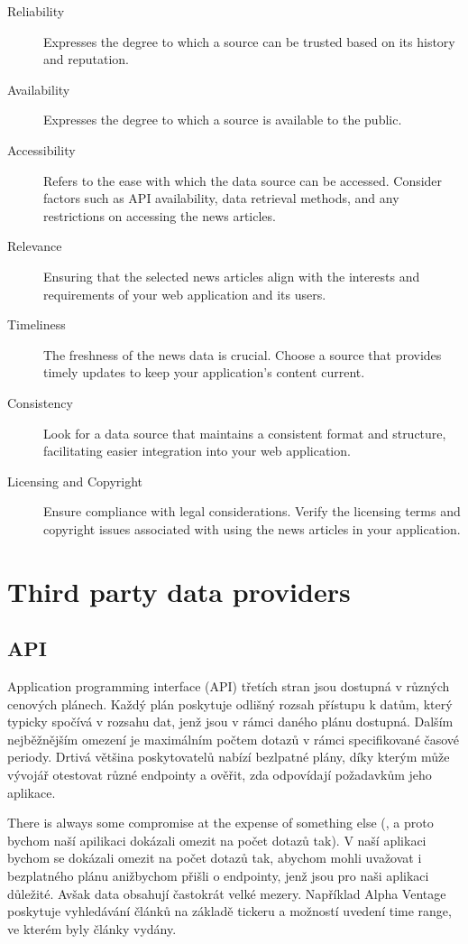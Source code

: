 \begin{description}
    \item[Reliability] Expresses the degree to which a source can be trusted based on its history and reputation.
    \item[Availability] Expresses the degree to which a source is available to the public.
    \item[Accessibility] Refers to the ease with which the data source can be accessed. Consider factors such as API availability, data retrieval methods, and any restrictions on accessing the news articles.
    \item[Relevance] Ensuring that the selected news articles align with the interests and requirements of your web application and its users.
    \item[Timeliness] The freshness of the news data is crucial. Choose a source that provides timely updates to keep your application's content current.
    \item[Consistency] Look for a data source that maintains a consistent format and structure, facilitating easier integration into your web application.
    \item[Licensing and Copyright] Ensure compliance with legal considerations. Verify the licensing terms and copyright issues associated with using the news articles in your application.
\end{description}

\section{Third party data providers}
\subsection*{API}
Application programming interface (API) třetích stran jsou dostupná v různých cenových plánech. Každý plán poskytuje odlišný rozsah přístupu k datům, který typicky spočívá v rozsahu dat, jenž jsou v rámci daného plánu dostupná. Dalším nejběžnějším omezení je maximálním počtem dotazů v rámci specifikované časové periody. Drtivá většina poskytovatelů nabízí bezlpatné plány, díky kterým může vývojář otestovat různé endpointy a ověřit, zda odpovídají požadavkům jeho aplikace.

There is always some compromise at the expense of something else (, a proto bychom naší apilikaci dokázali omezit na počet dotazů tak). V naší aplikaci bychom se dokázali omezit na počet dotazů tak, abychom mohli uvažovat i bezplatného plánu anižbychom přišli o endpointy, jenž jsou pro naši aplikaci důležité. Avšak data obsahují častokrát velké mezery. Například Alpha Ventage poskytuje vyhledávání článků na základě tickeru a možností uvedení time range, ve kterém byly články vydány.

